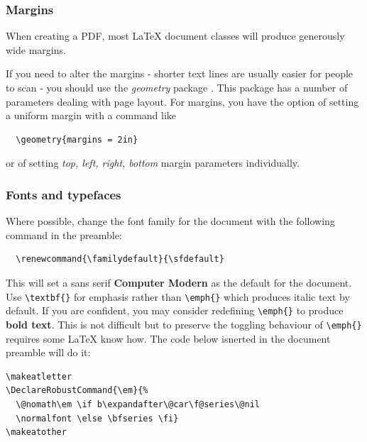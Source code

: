 \documentclass[]{article}
\makeatletter
\renewcommand{\familydefault}{\sfdefault}
\DeclareRobustCommand{\em}{%
  \@nomath\em \if b\expandafter\@car\f@series\@nil
  \normalfont \else \bfseries \fi}
\makeatother
\begin{document}
\hypertarget{margins}{%
\subsubsection{Margins}\label{margins}}

When creating a PDF, most \LaTeX{} document classes will produce generously wide margins.

If you need to alter the margins - shorter text lines are usually easier for people to scan - you should use the \emph{geometry} package \cite{geometry}.  This package has a number of parameters dealing with page layout.  For margins, you have the option of setting a uniform margin with a command like

\begin{verbatim}
  \geometry{margins = 2in}
\end{verbatim}

or of setting \emph{top, left, right, bottom} margin parameters individually.

\hypertarget{fonts-and-typefaces}{%
\subsubsection{Fonts and typefaces}\label{fonts-and-typefaces}}

Where possible, change the font family for the document with the
following command in the preamble:

\begin{verbatim}
  \renewcommand{\familydefault}{\sfdefault}
\end{verbatim}

This will set a sans serif \textbf{Computer Modern} as the default for
the document. Use \texttt{\textbackslash{}textbf\{\}} for emphasis
rather than \texttt{\textbackslash{}emph\{\}} which produces italic text
by default. If you are confident, you may consider redefining
\texttt{\textbackslash{}emph\{\}} to produce \textbf{bold text}. This is
not difficult but to preserve the toggling behaviour of
\texttt{\textbackslash{}emph\{\}} requires some LaTeX know how. The code
below isnerted in the document preamble will do it:

\begin{verbatim}
\makeatletter
\DeclareRobustCommand{\em}{%
  \@nomath\em \if b\expandafter\@car\f@series\@nil
  \normalfont \else \bfseries \fi}
\makeatother
\end{verbatim}

\citep{defineemph}
\end{document}
